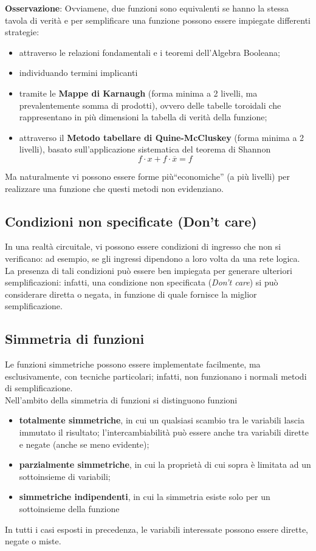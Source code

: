 \documentclass[a4paper]{extarticle}
\newcommand{\quotes}[1]{``#1''}
\begin{document}
\vspace{1em}
\noindent
\textbf{Osservazione}: Ovviamene, due funzioni sono equivalenti se hanno la stessa tavola di verità e per semplificare una funzione possono essere impiegate differenti strategie:
\begin{itemize}
    \item attraverso le relazioni fondamentali e i teoremi dell'Algebra Booleana;
    \item individuando termini implicanti
    \item tramite le \textbf{Mappe di Karnaugh} (forma minima a 2 livelli, ma prevalentemente somma di prodotti), ovvero delle tabelle toroidali che rappresentano in più dimensioni la tabella di verità della funzione;
    \item attraverso il \textbf{Metodo tabellare di Quine-McCluskey} (forma minima a 2 livelli), basato sull'applicazione sistematica del teorema di Shannon
    \[f \cdot x + f \cdot \overline{x} = f\]
\end{itemize}
Ma naturalmente vi possono essere forme più\quotes{economiche} (a più livelli) per realizzare una funzione che questi metodi non evidenziano.

\vspace{1em}
\noindent
\subsection{Condizioni non specificate (Don't care)}
In una realtà circuitale, vi possono essere condizioni di ingresso che non si verificano: ad esempio, se gli ingressi dipendono a loro volta da una rete logica.\\
La presenza di tali condizioni può essere ben impiegata per generare ulteriori semplificazioni: infatti, una condizione non specificata (\textit{Don't care}) si può considerare diretta o negata, in funzione di quale fornisce la miglior semplificazione.

\vspace{1em}
\noindent
\subsection{Simmetria di funzioni}
Le funzioni simmetriche possono essere implementate facilmente, ma esclusivamente, con tecniche particolari; infatti, non funzionano i normali metodi di semplificazione.\\
Nell'ambito della simmetria di funzioni si distinguono funzioni
\begin{itemize}
    \item \textbf{totalmente simmetriche}, in cui un qualsiasi scambio tra le variabili lascia immutato il risultato; l'intercambiabilità può essere anche tra variabili dirette e negate (anche se meno evidente);
    \item \textbf{parzialmente simmetriche}, in cui la proprietà di cui sopra è limitata ad un sottoinsieme di variabili;
    \item \textbf{simmetriche indipendenti}, in cui la simmetria esiste solo per un sottoinsieme della funzione
\end{itemize}
In tutti i casi esposti in precedenza, le variabili interessate possono essere dirette, negate o miste.
\end{document}
